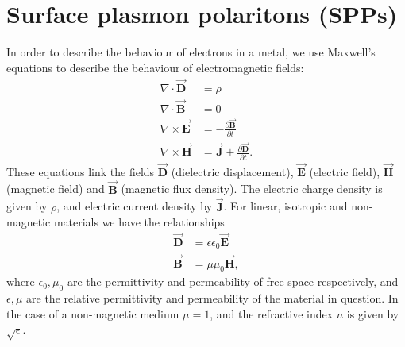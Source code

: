 \section{Surface plasmon polaritons (SPPs)}
In order to describe the behaviour of electrons in a metal, we use Maxwell's equations to describe the behaviour of electromagnetic fields:
\begin{subequations}
\label{Maxwell}
\begin{align}
\nabla \cdot \vec{\mathbf{D}} &= \rho \label{Maxwell1}\\
\nabla \cdot \vec{\mathbf{B}} &= 0 \label{Maxwell2}\\
\nabla \times \vec{\mathbf{E}} &= - \frac{\partial \vec{\mathbf{B}}}{\partial t} \label{Maxwell3}\\
\nabla \times \vec{\mathbf{H}} &= \vec{\mathbf{J}} + \frac{\partial \vec{\mathbf{D}}}{\partial t} \label{Maxwell4}. 
\end{align}
\end{subequations}
These equations link the fields $\vec{\mathbf{D}}$ (dielectric displacement), $\vec{\mathbf{E}}$ (electric field), $\vec{\mathbf{H}}$ (magnetic field) and $\vec{\mathbf{B}}$ (magnetic flux density). The electric charge density is given by $\rho$, and electric current density by $\vec{\mathbf{J}}$. For linear, isotropic and non-magnetic materials we have the relationships
\begin{subequations}
\label{fieldrelations}
\begin{align}
\vec{\mathbf{D}} &= \epsilon \epsilon_0 \vec{\mathbf{E}} \label{DE}\\
\vec{\mathbf{B}} &= \mu \mu_0 \vec{\mathbf{H}} \label{BH},
\end{align}
\end{subequations}
where $\epsilon_0, \mu_0$ are the permittivity and permeability of free space respectively, and $\epsilon, \mu$ are the relative permittivity and permeability of the material in question. In the case of a non-magnetic medium $\mu=1$, and the refractive index $n$ is given by $\sqrt{\epsilon}$.

